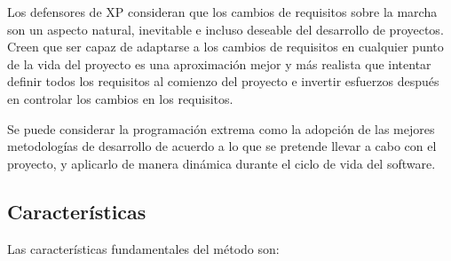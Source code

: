 Los defensores de XP consideran que los cambios de requisitos sobre la marcha son un aspecto natural, inevitable e incluso deseable del desarrollo de proyectos. Creen que ser capaz de adaptarse a los cambios de requisitos en cualquier punto de la vida del proyecto es una aproximación mejor y más realista que intentar definir todos los requisitos al comienzo del proyecto e invertir esfuerzos después en controlar los cambios en los requisitos.

Se puede considerar la programación extrema como la adopción de las mejores metodologías de desarrollo de acuerdo a lo que se pretende llevar a cabo con el proyecto, y aplicarlo de manera dinámica durante el ciclo de vida del software.

\subsection{Características}
Las características fundamentales del método son:

